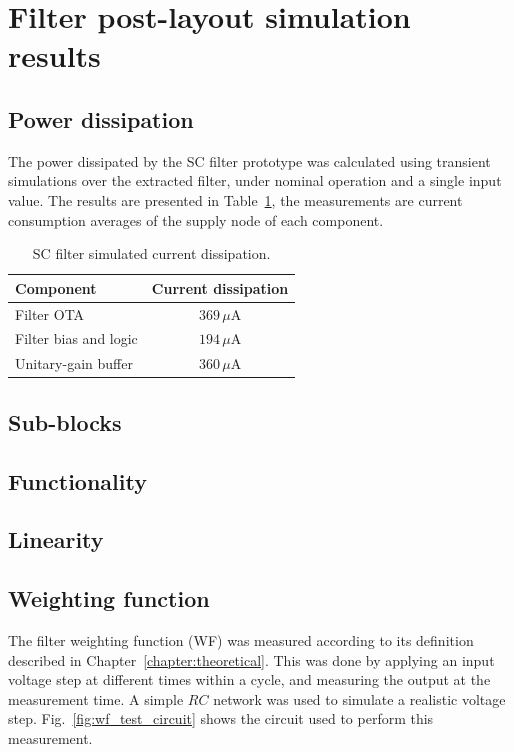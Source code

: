 \section{Filter post-layout simulation results}
\subsection{Power dissipation} 

The power dissipated by the SC filter prototype was calculated using transient simulations over the extracted filter, under nominal operation and a single input value. The results are presented in Table~\ref{tab:power_dissipation}, the measurements are current consumption averages of the supply node of each component. 

\begin{table}
	\begin{center}
		\begin{tabular}{|l|c|}\hline
			{\bf Component} & {\bf Current dissipation} \\ \hline\hline
			Filter OTA & $369\,\mu\text{A}$ \\ \hline
			Filter bias and logic & $194\,\mu\text{A}$ \\ \hline
			Unitary-gain buffer & $360\,\mu\text{A}$ \\ \hline
		\end{tabular}
		\vspace*{5pt}
		\caption{SC filter simulated current dissipation.}
		\label{tab:power_dissipation}
	\end{center}
\end{table}

\subsection{Sub-blocks}
\subsection{Functionality} 
\subsection{Linearity}
\subsection{Weighting function}
The filter weighting function (WF) was measured according to its definition described in Chapter~\ref{chapter:theoretical}. This was done by applying an input voltage step at different times within a cycle, and measuring the output at the measurement time. A simple $RC$ network was used to simulate a realistic voltage step. Fig.~\ref{fig:wf_test_circuit} shows the circuit used to perform this measurement. 

